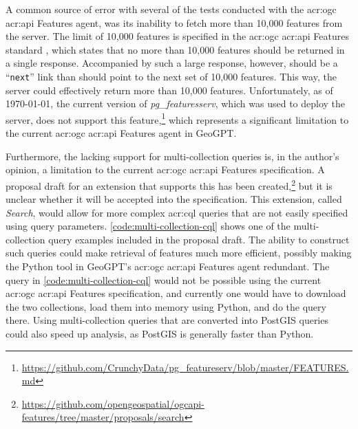 A common source of error with several of the tests conducted with the \acrshort{acr:ogc} \acrshort{acr:api} Features agent, was its inability to fetch more than 10,000 features from the server. The limit of 10,000 features is specified in the \acrshort{acr:ogc} \acrshort{acr:api} Features standard \citep{opengeospatialconsortiumOGCAPIFeatures2022}, which states that no more than 10,000 features should be returned in a single response. Accompanied by such a large response, however, should be a \enquote{\texttt{next}} link than should point to the next set of 10,000 features. This way, the server could effectively return more than 10,000 features. Unfortunately, as of \today, the current version of \textit{pg\_featuresserv}, which was used to deploy the server, does not support this feature,\footnote{\url{https://github.com/CrunchyData/pg_featureserv/blob/master/FEATURES.md}} which represents a significant limitation to the current \acrshort{acr:ogc} \acrshort{acr:api} Features agent in GeoGPT.

Furthermore, the lacking support for multi-collection queries is, in the author's opinion, a limitation to the current \acrshort{acr:ogc} \acrshort{acr:api} Features specification. A proposal draft for an extension that supports this has been created,\footnote{\url{https://github.com/opengeospatial/ogcapi-features/tree/master/proposals/search}} but it is unclear whether it will be accepted into the specification. This extension, called \textit{Search}, would allow for more complex \acrshort{acr:cql} queries that are not easily specified using query parameters. \autoref{code:multi-collection-cql} shows one of the multi-collection query examples included in the proposal draft. The ability to construct such queries could make retrieval of features much more efficient, possibly making the Python tool in GeoGPT's \acrshort{acr:ogc} \acrshort{acr:api} Features agent redundant. The query in \autoref{code:multi-collection-cql} would not be possible using the current \acrshort{acr:ogc} \acrshort{acr:api} Features specification, and currently one would have to download the two collections, load them into memory using Python, and do the query there. Using multi-collection queries that are converted into PostGIS queries could also speed up analysis, as PostGIS is generally faster than Python.


